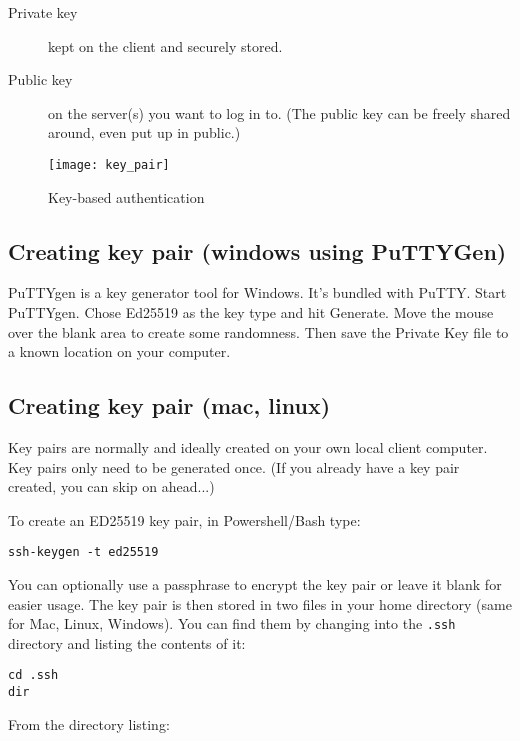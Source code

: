 \begin{description}
\item[Private key]
kept on the client and securely stored.
\item[Public key]
on the server(s) you want to log in to. (The public key can be freely
shared around, even put up in public.)
\end{description}

\begin{figure}[htbp]
  \centering
  \texttt{[image: key\_pair]}
  \caption{Key-based authentication}
  \label{fig:ssh-key-authentication}
\end{figure}

\subsection{Creating key pair (windows using PuTTYGen)}
\label{sec:creating-key-pair-windows}

PuTTYgen is a key generator tool for Windows.
It's bundled with PuTTY.
Start PuTTYgen.
Chose Ed25519 as the key type and hit Generate.
Move the mouse over the blank area to create some randomness.
Then save the Private Key file to a known location on your computer.


\subsection{Creating key pair (mac, linux)}
\label{sec:creating-key-pair-unix}

Key pairs are normally and ideally created on your own local client computer.
Key pairs only need to be generated once.
(If you already have a key pair created, you can skip on ahead...)

To create an ED25519 key pair, in Powershell/Bash type:

\begin{verbatim}
ssh-keygen -t ed25519
\end{verbatim}

You can optionally use a passphrase to encrypt the key pair or leave it blank for easier usage.
The key pair is then stored in two files in your home directory (same for Mac, Linux, Windows).
You can find them by changing into the \texttt{.ssh} directory and listing the contents of it:

\begin{verbatim}
cd .ssh
dir
\end{verbatim}

From the directory listing:

